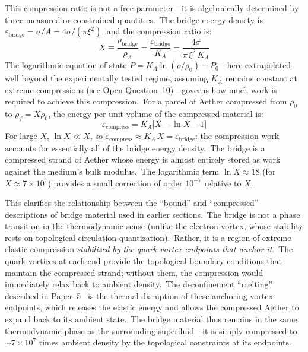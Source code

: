 ﻿\documentclass[12pt,letterpaper]{article}
\newcommand{\rhoa}{\rho_{\!A}}
\newcommand{\Ka}{K_{\!A}}
\begin{document}
This compression ratio is not a free parameter---it is algebraically determined
by three measured or constrained quantities.\ The bridge energy density is
$\varepsilon_{\mathrm{bridge}} = \sigma / A = 4\sigma / (\pi\xi^2)$, and the
compression ratio is:
%
\begin{equation}
  X \equiv \frac{\rho_{\mathrm{bridge}}}{\rhoa}
    = \frac{\varepsilon_{\mathrm{bridge}}}{\Ka}
    = \frac{4\sigma}{\pi\,\xi^2\,\Ka}
  \label{eq:compression-ratio}
\end{equation}
%
The logarithmic equation of state $P = \Ka \ln(\rho/\rho_0) + P_0$---here
extrapolated well beyond the experimentally tested regime, assuming $\Ka$ remains
constant at extreme compressions (see Open Question~10)---governs
how much work is required to achieve this compression.\ For a parcel of Aether
compressed from $\rho_0$ to $\rho_f = X \rho_0$, the energy per unit volume of
the compressed material is:
%
\begin{equation}
  \varepsilon_{\mathrm{compress}} = \Ka\bigl[X - \ln X - 1\bigr]
  \label{eq:compression-energy}
\end{equation}
%
For large $X$, $\ln X \ll X$, so $\varepsilon_{\mathrm{compress}} \approx
\Ka\, X = \varepsilon_{\mathrm{bridge}}$: the compression work accounts for
essentially all of the bridge energy density.\ The bridge is a compressed
strand of Aether whose energy is almost entirely stored as work against the
medium's bulk modulus.\ The logarithmic
term $\ln X \approx 18$ (for $X \approx 7 \times 10^7$) provides a small correction
of order $10^{-7}$ relative to $X$.

This clarifies the relationship between the ``bound'' and ``compressed'' descriptions
of bridge material used in earlier sections.\ The bridge is not a phase transition
in the thermodynamic sense (unlike the electron vortex, whose stability rests on
topological circulation quantization).\ Rather, it is a region of extreme elastic
compression \emph{stabilized by the quark vortex endpoints that anchor it}.\ The
quark vortices at each end provide the topological boundary conditions that maintain
the compressed strand; without them, the compression would immediately relax back
to ambient density.\ The deconfinement ``melting'' described in
Paper~5~\cite{otto-strong} is the thermal disruption of these anchoring vortex
endpoints, which releases the elastic energy and allows the compressed Aether to
expand back to its ambient state.\ The bridge material thus remains in the same
thermodynamic phase as the surrounding superfluid---it is simply compressed to
$\sim\!7 \times 10^7$ times ambient density by the topological constraints at its
endpoints.
\end{document}

